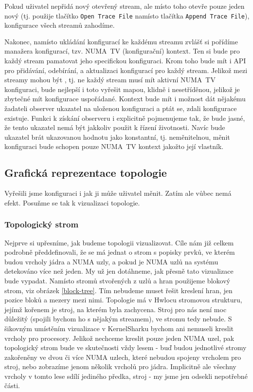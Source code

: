 Pokud uživatel nepřidá nový otevřený stream, ale místo toho otevře pouze jeden nový (tj. použije tlačítko \texttt{Open Trace File} namísto tlačítka \texttt{Append Trace File}), konfigurace všech streamů zahodíme.

Nakonec, namísto ukládání konfigurací ke každému streamu zvlášť si pořídíme manažera konfigurací, tzv. NUMA~TV (konfigurační) kontext. Ten si bude pro každý stream pamatovat jeho specifickou konfiguraci. Krom toho bude mít i API pro přidávání, odebírání, a aktualizaci konfigurací pro každý stream. Jelikož mezi streamy mohou být , tj. ne každý stream musí mít aktivní NUMA~TV konfiguraci, bude nejlepší i toto vyřešit mapou, klidně i nesetříděnou, jelikož je zbytečné mít konfigurace uspořádané. Kontext bude mít i možnost dát nějakému žadateli observer ukazatel na uloženou konfiguraci a ptát se, zdali konfigurace existuje. Funkci k získání observeru i explicitně pojmenujeme tak, že bude jasné, že tento ukazatel nemá být jakkoliv použit k řízení životnosti. Navíc bude ukazatel brát ukazovanou hodnotu jako konstantní, tj. neměnitelnou, měnit konfiguraci bude schopen pouze NUMA~TV kontext jakožto její vlastník.

\subsection{Grafická reprezentace topologie}
\label{numatv-grt}
Vyřešili jsme konfiguraci i jak ji může uživatel měnit. Zatím ale vůbec nemá efekt. Posuňme se tak k vizualizaci topologie.

\subsubsection{Topologický strom}
Nejprve si upřesníme, jak budeme topologii vizualizovat. Cíle nám již celkem podrobně předdefinovali, že se má jednat o strom s popisky prvků, ve kterém budou vrcholy jádra a NUMA uzly, a pokud je NUMA uzlů na systému detekováno více než jeden. My už jen dotáhneme, jak přesně tato vizualizace bude vypadat. Namísto stromů stvořených z uzlů a hran použijeme blokový strom, viz obrázek \ref{block-tree}. Tím nebudeme muset řešit kreslení hran, jen pozice bloků a mezery mezi nimi. Topologie má v Hwlocu stromovou strukturu, jejímž kořenem je stroj, na kterém byla zachycena. Stroj pro nás není moc důležitý (spojili bychom ho s nějakým streamem), ve stromu tedy nebude. S šikovným umístěním vizualizace v KernelSharku bychom ani nemuseli kreslit vrcholy pro procesory. Jelikož nechceme kreslit pouze jeden NUMA uzel, pak topologický strom bude ve skutečnosti vždy lesem - buď budou jednotlivé stromy zakořeněny ve dvou či více NUMA uzlech, které nebudou spojeny vrcholem pro stroj, nebo zobrazíme jenom několik vrcholů pro jádra. Implicitně ale všechny vrcholy v tomto lese sdílí jediného předka, stroj - my jsme jen odsekli nepotřebné části.

